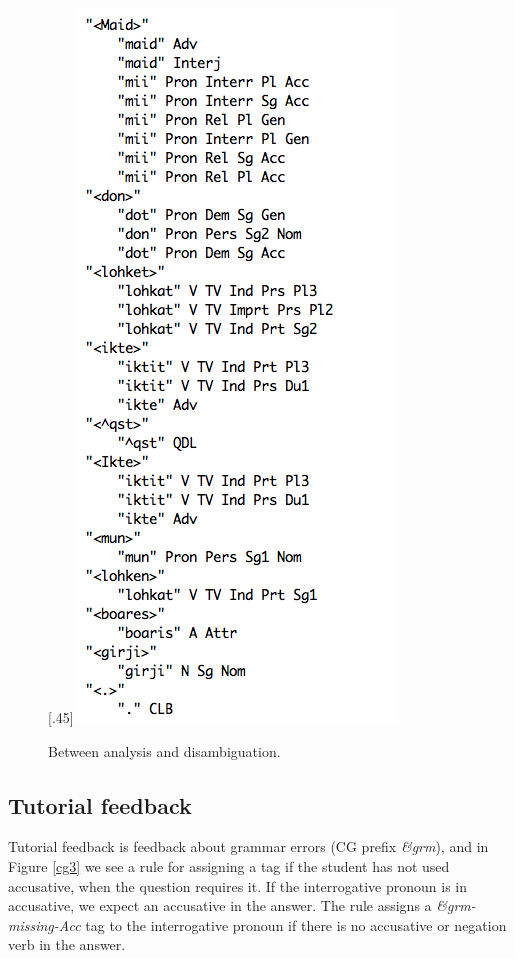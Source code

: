 \documentclass[11pt]{article}
\begin{document}
\begin{figure}[htb]
\begin{center}
\scalebox{.53}[.45]{\includegraphics{presentation/img/iktelohken3.png}}
\caption{Between analysis and disambiguation.}
\label{iktelohken}
\end{center}
\end{figure}

\subsection{Tutorial feedback} \label{tutorial}
Tutorial feedback is feedback about grammar errors (CG prefix \textit{\&grm}), and in Figure \ref{cg3} we see a rule for assigning a tag if the student has not used accusative, when the question requires it. If the interrogative pronoun is in accusative, we expect an accusative in the answer.
The rule assigns a \textit{\&grm-missing-Acc} tag to the interrogative pronoun if there is no accusative or negation verb in the answer.
\end{document}
